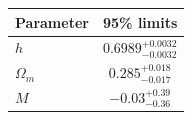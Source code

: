 \begin{tabular} { l  c}

 Parameter &  95\% limits\\
\hline
{\boldmath$h              $} & $0.6989^{+0.0032}_{-0.0032}$\\

{\boldmath$Ω_m            $} & $0.285^{+0.018}_{-0.017}   $\\

{\boldmath$M              $} & $-0.03^{+0.39}_{-0.36}     $\\
\hline
\end{tabular}